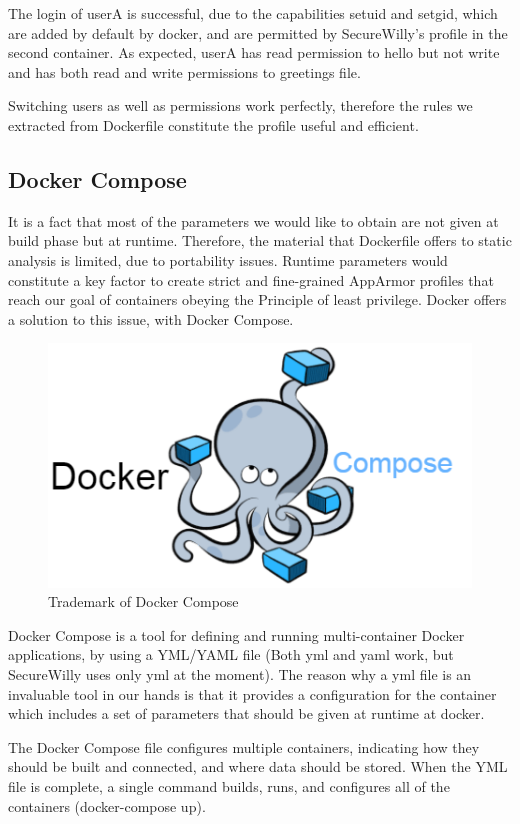 The login of userA is successful, due to the capabilities setuid and setgid, which are added by default by docker, and are permitted by SecureWilly's profile in the second container. As expected, userA has read permission to hello but not write and has both read and write permissions to greetings file.

Switching users as well as permissions work perfectly, therefore the rules we extracted from Dockerfile constitute the profile useful and efficient.

\subsection{Docker Compose}
It is a fact that most of the parameters we would like to obtain are not given at build phase but at runtime. Therefore, the material that Dockerfile offers to static analysis is limited, due to portability issues. Runtime parameters would constitute a key factor to create strict and fine-grained AppArmor profiles that reach our goal of containers obeying the Principle of least privilege. Docker offers a solution to this issue, with Docker Compose.

\begin{figure}[h!]
  \centering
   \includegraphics[width=0.5\linewidth]{../figures/dockercompose.png}
   \caption{Trademark of Docker Compose}
\end{figure}

Docker Compose is a tool for defining and running multi-container Docker applications, by using a YML/YAML file (Both yml and yaml work, but SecureWilly uses only yml at the moment). The reason why a yml file is an invaluable tool in our hands is that it provides a configuration for the container which includes a set of parameters that should be given at runtime at docker.

The Docker Compose file configures multiple containers, indicating how they should be built and connected, and where data should be stored. When the YML file is complete, a single command builds, runs, and configures all of the containers (docker-compose up).

